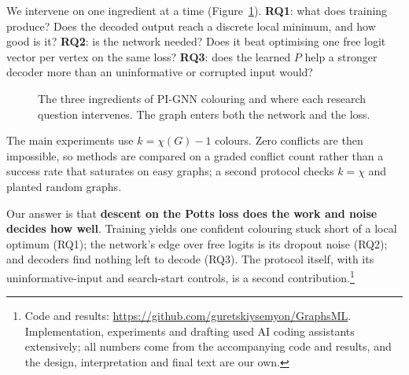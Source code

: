 \documentclass[11pt]{article}
\begin{document}
We intervene on one ingredient at a time (Figure~\ref{fig:pipeline}).
\textbf{RQ1}: what does training
produce? Does the decoded output reach a discrete local minimum, and how good
is it? \textbf{RQ2}: is the network needed? Does it beat optimising one free
logit vector per vertex on the same loss? \textbf{RQ3}: does the learned $P$
help a stronger decoder more than an uninformative or corrupted input would?

\begin{figure}[t]
\centering
{}
\caption{The three ingredients of PI-GNN colouring and where each research
question intervenes. The graph enters both the network and the loss.}
\label{fig:pipeline}
\end{figure}

The main experiments use $k=\chi(G)-1$ colours. Zero conflicts are then
impossible, so methods are compared on a graded conflict count rather than a
success rate that saturates on easy graphs; a second protocol checks $k=\chi$
and planted random graphs.

Our answer is that \textbf{descent on the Potts loss does the work and noise
decides how well}. Training yields one confident colouring stuck short of a
local optimum (RQ1); the network's edge over free logits is its dropout noise
(RQ2); and decoders find nothing left to decode (RQ3). The protocol itself,
with its uninformative-input and search-start controls, is a second
contribution.\footnote{Code and results:
\url{https://github.com/guretskiysemyon/GraphsML}. Implementation,
experiments and drafting used AI coding assistants extensively; all numbers
come from the accompanying code and results, and the design, interpretation
and final text are our own.}
\end{document}
